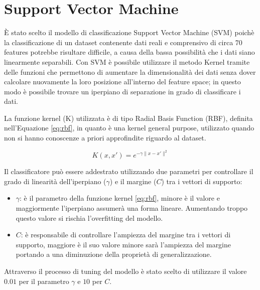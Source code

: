 \section{Support Vector Machine}
È stato scelto il modello di classificazione 
Support Vector Machine (SVM) poichè la classificazione di un dataset contenente 
dati reali e comprensivo di circa 70 features potrebbe risultare difficile, a 
causa della bassa possibilità che i dati siano linearmente separabili. 
Con SVM è possibile utilizzare il metodo Kernel tramite delle funzioni 
che permettono di aumentare la dimensionalità dei dati senza dover 
calcolare nuovamente la loro posizione all'interno del feature space; in questo 
modo è possibile trovare un iperpiano di separazione in grado di classificare 
i dati.

La funzione kernel (K) utilizzata è di tipo 
Radial Basis Function (RBF), definita nell'Equazione \ref{eq:rbf}, in quanto 
è una kernel general purpose, utilizzato quando non si hanno conoscenze a priori 
approfindite riguardo al dataset.

\begin{equation}\label{eq:rbf}
    K(x, x') = e^{- \gamma \|x - x'\|^2}
\end{equation}

Il classificatore può essere addestrato utilizzando due parametri per 
controllare il grado di linearità dell'iperpiano ($\gamma$) e il margine ($C$) 
tra i vettori di supporto:

\begin{itemize}
    \item $\gamma$: è il parametro della funzione kernel \ref{eq:rbf}, minore è 
    il valore e maggiormente l'iperpiano assumerà una forma lineare. 
    Aumentando troppo questo valore si rischia l'overfitting del modello.
    \item $C$: è responsabile di controllare l'ampiezza del margine tra i 
    vettori di supporto, maggiore è il suo valore minore sarà l'ampiezza del 
    margine portando a una diminuzione della proprietà di generalizzazione.
\end{itemize}

Attraverso il processo di tuning del modello è stato scelto di utilizzare il 
valore $0.01$ per il parametro $\gamma$ e $10$ per $C$.
